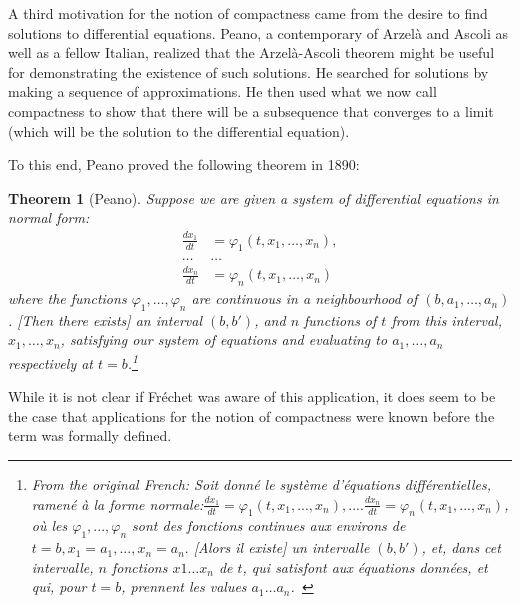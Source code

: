 \documentclass[12pt]{article}
\newtheorem{thm}{Theorem}[section]
\begin{document}
A third motivation for the notion of compactness came from the desire to find
solutions to differential equations. Peano, a contemporary of Arzel\`{a} and Ascoli as
well as a fellow Italian, realized that the Arzel\`{a}-Ascoli theorem might be useful
for demonstrating the existence of such solutions. He searched for solutions by
making a sequence of approximations. He then used what we now call compactness to
show that there will be a subsequence that converges to a limit (which will be the
solution to the differential equation).

To this end, Peano proved the following theorem in 1890:

 \begin{thm} [Peano]

Suppose we are given a system of differential equations in normal form:
\begin{align*}
 \frac{dx_1}{dt}&= \varphi_1(t, x_1, \ldots ,x_n),\\
\ldots & \ldots \\
\frac{dx_n}{dt}&= \varphi_n(t, x_1, \ldots ,x_n)
\end{align*}
where the functions $\varphi_1, \ldots, \varphi_n$ are continuous in a neighbourhood of $(b, a_1, \ldots, a_n)$. [Then there exists] an interval $(b,b')$, and $n$ functions of $t$ from this interval, $x_1, \ldots, x_n$, satisfying our system of equations and evaluating to $a_1, \ldots, a_n$ respectively at $t=b$.\footnote{From the original French: Soit donn\'{e} le syst\`{e}me d'\'{e}quations diff\'{e}rentielles, ramen\'{e} \`{a} la forme normale:$ \frac{dx_1}{dt}= \varphi_1(t, x_1, ... ,x_n), ....  \frac{dx_n}{dt}= \varphi_n(t, x_1, ... ,x_n)$, o\`{u} les $ \varphi_1, ..., \varphi_n$ sont des fonctions continues aux environs de $t = b, x_1 = a_1,..., x_n = a_n.$ [Alors il existe] un intervalle $(b,b')$, et, dans cet intervalle, $n$ fonctions $x1  \ldots x_n$ de $t$, qui satisfont  aux \'equations donn\'ees, et qui, pour $t=b$, prennent les values $a_1 \ldots a_n$.~\cite[p.182]{pean}}

\end{thm}

While it is not clear if Fr\'{e}chet was aware of this application, it does seem to be the case that applications for the notion of
compactness were known before the term was formally defined.  
\end{document}
